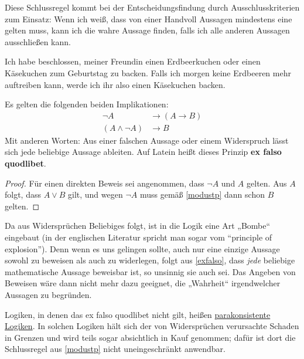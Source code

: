 \begin{bem}
    Diese Schlussregel kommt bei der Entscheidungsfindung durch Ausschlusskriterien zum Einsatz: Wenn ich weiß, dass von einer Handvoll Aussagen mindestens eine gelten muss, kann ich die wahre Aussage finden, falls ich alle anderen Aussagen ausschließen kann.
\end{bem}


\begin{bsp}
    Ich habe beschlossen, meiner Freundin einen Erdbeerkuchen oder einen Käsekuchen zum Geburtstag zu backen. Falls ich morgen keine Erdbeeren mehr auftreiben kann, werde ich ihr also einen Käsekuchen backen.
\end{bsp}


\begin{satz} \label{exfalso} 
    Es gelten die folgenden beiden Implikationen:
    \begin{align*}
        \neg A & \to (A\to B) \\
        (A\land \neg A) & \to B
    \end{align*}
    Mit anderen Worten: Aus einer falschen Aussage oder einem Widerspruch lässt sich jede beliebige Aussage ableiten. Auf Latein heißt dieses Prinzip \textbf{ex falso quodlibet}.
\end{satz}
\begin{proof}
    Für einen direkten Beweis sei angenommen, dass $\neg A$ und $A$ gelten. Aus $A$ folgt, dass $A\lor B$ gilt, und wegen $\neg A$ muss gemäß \cref{modustp} dann schon $B$ gelten.
\end{proof}


\begin{vorschau} \label{explosion}
    Da aus Widersprüchen Beliebiges folgt, ist in die Logik eine Art „Bombe“ eingebaut (in der englischen Literatur spricht man sogar vom ``principle of explosion''). Denn wenn es uns gelingen sollte, auch nur eine einzige Aussage sowohl zu beweisen als auch zu widerlegen, folgt aus \cref{exfalso}, dass \emph{jede} beliebige mathematische Aussage beweisbar ist, so unsinnig sie auch sei. Das Angeben von Beweisen wäre dann nicht mehr dazu geeignet, die „Wahrheit“ irgendwelcher Aussagen zu begründen.
    
    Logiken, in denen das ex falso quodlibet nicht gilt, heißen \href{https://ncatlab.org/nlab/show/paraconsistent+logic}{parakonsistente Logiken}. In solchen Logiken hält sich der von Widersprüchen verursachte Schaden in Grenzen und wird teils sogar absichtlich in Kauf genommen; dafür ist dort die Schlussregel aus \cref{modustp} nicht uneingeschränkt anwendbar.
\end{vorschau}






